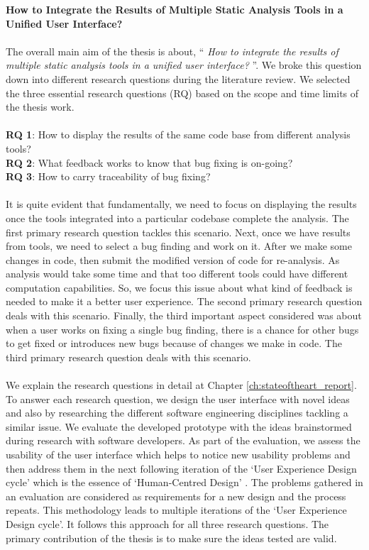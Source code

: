 \textbf{How to Integrate the Results of Multiple Static Analysis Tools in a Unified User Interface?}
\\ \\
The overall main aim of the thesis is about, “ \textit{How to integrate the results of multiple static analysis tools in a unified user interface?} ”. We broke this question down into different research questions during the literature review. We selected the three essential research questions (RQ) based on the scope and time limits of the thesis work. \\ \\

\noindent\textbf{RQ 1}: How to display the results of the same code base from different analysis tools? \\
\textbf{RQ 2}: What feedback works to know that bug fixing is on-going? \\
\textbf{RQ 3}: How to carry traceability of bug fixing? \\ \\

It is quite evident that fundamentally, we need to focus on displaying the results once the tools integrated into a particular codebase complete the analysis. The first primary research question tackles this scenario. Next, once we have results from tools, we need to select a bug finding and work on it. After we make some changes in code, then submit the modified version of code for re-analysis. As analysis would take some time and that too different tools could have different computation capabilities. So, we focus this issue about what kind of feedback is needed to make it a better user experience. The second primary research question deals with this scenario. Finally, the third important aspect considered was about when a user works on fixing a single bug finding, there is a chance for other bugs to get fixed or introduces new bugs because of changes we make in code. The third primary research question deals with this scenario. \\ \\

We explain the research questions in detail at Chapter \ref{ch:stateoftheart_report}. To answer each research question, we design the user interface with novel ideas and also by researching the different software engineering disciplines tackling a similar issue. We evaluate the developed prototype with the ideas brainstormed during research with software developers. As part of the evaluation, we assess the usability \cite{usability} of the user interface which helps to notice new usability problems and then address them in the next following iteration of the ‘User Experience Design cycle’ \cite{UXD} which is the essence of ‘Human-Centred Design’ \cite{hcd}. The problems gathered in an evaluation are considered as requirements for a new design and the process repeats. This methodology leads to multiple iterations of the ‘User Experience Design cycle’. It follows this approach for all three research questions. The primary contribution of the thesis is to make sure the ideas tested are valid. \\ \\

